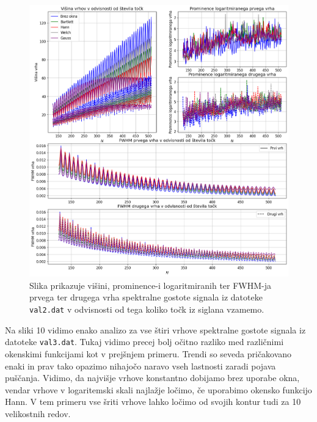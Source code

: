 \documentclass[slovene,11pt,a4paper]{article}
\begin{document}
\begin{figure}[h!]
\centering
\includegraphics[width=15cm]{slika9.png}
\caption{Slika prikazuje višini, prominence-i logaritmiranih ter FWHM-ja prvega ter drugega vrha spektralne gostote signala iz datoteke \texttt{val2.dat} v odvisnosti od tega koliko točk iz siglana vzamemo.}
\end{figure}

Na sliki 10 vidimo enako analizo za vse štiri vrhove spektralne gostote signala iz datoteke \texttt{val3.dat}. Tukaj vidimo precej bolj očitno razliko med različnimi okenskimi funkcijami kot v prejšnjem primeru. Trendi so seveda pričakovano enaki in prav tako opazimo nihajočo naravo vseh lastnosti zaradi pojava puščanja. Vidimo, da najvišje vrhove konstantno dobijamo brez uporabe okna, vendar vrhove v logaritemski skali najlažje ločimo, če uporabimo okensko funkcijo Hann. V tem primeru vse šriti vrhove lahko ločimo od svojih kontur tudi za 10 velikostnih redov.

\newpage
\end{document}
